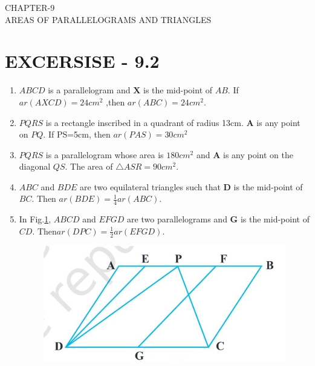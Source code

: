 \documentclass{article}
\let\vec\mathbf{}
\let\vec\mathbf
\begin{document}
\begin{center}
\textbf\large{CHAPTER-9  \\ AREAS OF PARALLELOGRAMS AND TRIANGLES}
\section*{EXCERSISE - 9.2}
\end{center}
\begin{enumerate}
\item $ABCD$ is a parallelogram and $\vec{X}$ is the mid-point of $AB$. If $ ar(AXCD)= 24 cm^2 $ ,then $ar(ABC) =  24cm^2 $.
\item $PQRS$ is a rectangle inscribed in a quadrant of radius 13cm. $\vec{A}$ is any point on $PQ$. If PS=5cm, then $ar(PAS)= 30 cm^2 $
\item $PQRS$ is a parallelogram whose area is $ 180 cm^2 $ and $\vec{A}$ is any point on the diagonal $QS$. The area of $\triangle ASR =90 cm^2$.
\item $ABC$ and $BDE$ are two equilateral triangles such that $\vec{D}$ is the mid-point of $BC$. Then $ar(BDE)=\frac{1}{4}  ar(ABC)$.
\item In Fig.\ref{figs:9.8.}, $ABCD$ and $EFGD$ are two parallelograms and $\vec{G}$ is the mid-point of $CD$. Then$ ar(DPC)=\frac{1}{2}  ar(EFGD)$.
\begin{figure}[h]
	\centering
	\includegraphics[width=\columnwidth]{figs/9.8.jpg}
	\caption{}
	\label{figs:9.8.}
\end{figure}

\end{enumerate}
\end{document}
